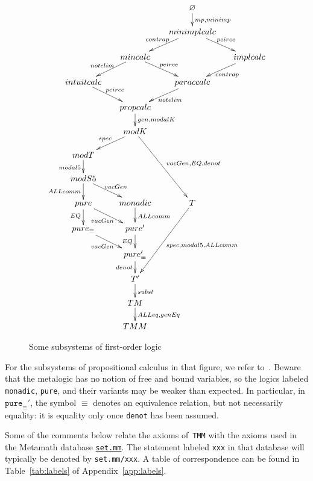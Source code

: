 \documentclass[11pt]{article}
\theoremstyle{plain}
\theoremstyle{definition}
\theoremstyle{remark}
\begin{document}
\begin{figure}[!ht]
\begin{equation*}
\xymatrix@=1.5em{
&& \varnothing \ar[d]^{\texttt{mp}, \texttt{minimp}}\\
&& \texttt{minimplcalc} \ar[dr]^{\texttt{peirce}} \ar[dl]_{\texttt{contrap}} \\
& \texttt{mincalc} \ar[dr]^{\texttt{peirce}} \ar[dl]_{\texttt{notelim}}
 && \texttt{implcalc} \ar[dl]^{\texttt{contrap}}\\
\texttt{intuitcalc} \ar[dr]^{\texttt{peirce}} && \texttt{paraccalc} \ar[dl]^{\texttt{notelim}}\\
& \texttt{propcalc} \ar[d]^{\texttt{gen}, \texttt{modalK}}\\
& \texttt{modK} \ar[dl]_{\texttt{spec}} \ar[dddr]^{\texttt{vacGen}, \texttt{EQ}, \texttt{denot}}\\
\texttt{modT} \ar[d]_{\texttt{modal5}} \\
\texttt{modS5} \ar[d]_{\texttt{ALLcomm}} \ar[dr]^{\texttt{vacGen}}\\
\texttt{pure} \ar[d]_{\texttt{EQ}} \ar[dr]_{\texttt{vacGen}}
 & \texttt{monadic} \ar[d]^{\texttt{ALLcomm}}
 & \texttt{T} \ar[dddl]^{\texttt{spec}, \texttt{modal5}, \texttt{ALLcomm}}\\
\texttt{pure}_\equiv \ar[dr]_{\texttt{vacGen}} &\texttt{pure}' \ar[d]_{\texttt{EQ}}\\
&\texttt{pure}_\equiv' \ar[d]_{\texttt{denot}}\\
& \texttt{T}' \ar[d]^{\texttt{subst}}\\
& \texttt{TM} \ar[d]^{\texttt{ALLeq}, \texttt{genEq}}\\
& \texttt{TMM}
}
\end{equation*}
\caption{Some subsystems of first-order logic}
\label{fig:subsystems}
\end{figure}


For the subsystems of propositional calculus in that figure, we refer to~\cite{robinson}.
Beware that the metalogic has no notion of free and bound variables, so the logics labeled
\texttt{monadic}, \texttt{pure}, and their variants may be weaker than expected.
In particular, in $\texttt{pure}_\equiv'$, the symbol $\equiv$ denotes an equivalence relation,
but not necessarily equality: it is equality only once \texttt{denot} has been assumed.

Some of the comments below relate the axioms of~\texttt{TMM} with the axioms used in the
Metamath database \href{https://us.metamath.org/mpeuni/mmset.html}{\texttt{set.mm}}.
The statement labeled \texttt{xxx} in that database will typically be denoted by
\texttt{set.mm/xxx}.
A table of correspondence can be found in Table~\ref{tab:labels} of Appendix~\ref{app:labels}.
\end{document}
